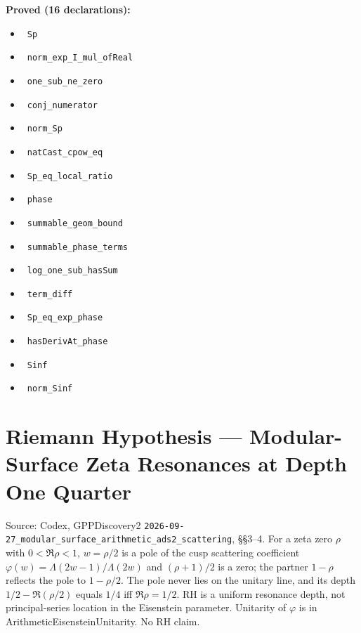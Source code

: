 \documentclass{report}
\theoremstyle{definition}
\begin{document}
\noindent\textbf{Proved (16 declarations):}
\begin{itemize}
  \item {}\leanok\ \texttt{Sp}
  \item {}\leanok\ \texttt{norm\_exp\_I\_mul\_ofReal}
  \item {}\leanok\ \texttt{one\_sub\_ne\_zero}
  \item {}\leanok\ \texttt{conj\_numerator}
  \item {}\leanok\ \texttt{norm\_Sp}
  \item {}\leanok\ \texttt{natCast\_cpow\_eq}
  \item {}\leanok\ \texttt{Sp\_eq\_local\_ratio}
  \item {}\leanok\ \texttt{phase}
  \item {}\leanok\ \texttt{summable\_geom\_bound}
  \item {}\leanok\ \texttt{summable\_phase\_terms}
  \item {}\leanok\ \texttt{log\_one\_sub\_hasSum}
  \item {}\leanok\ \texttt{term\_diff}
  \item {}\leanok\ \texttt{Sp\_eq\_exp\_phase}
  \item {}\leanok\ \texttt{hasDerivAt\_phase}
  \item {}\leanok\ \texttt{Sinf}
  \item {}\leanok\ \texttt{norm\_Sinf}
\end{itemize}

\section{Riemann Hypothesis --- Modular-Surface Zeta Resonances at Depth One Quarter}
Source: Codex, GPPDiscovery2 \texttt{2026-09-27\_modular\_surface\_arithmetic\_ads2\_scattering}, \S\S3--4. For a zeta zero $\rho$ with $0<\Re\rho<1$, $w=\rho/2$ is a pole of the cusp scattering coefficient $\varphi(w)=\Lambda(2w-1)/\Lambda(2w)$ and $(\rho+1)/2$ is a zero; the partner $1-\rho$ reflects the pole to $1-\rho/2$. The pole never lies on the unitary line, and its depth $1/2-\Re(\rho/2)$ equals $1/4$ iff $\Re\rho=1/2$. RH is a uniform resonance depth, not principal-series location in the Eisenstein parameter. Unitarity of $\varphi$ is in ArithmeticEisensteinUnitarity. No RH claim.
\end{document}
